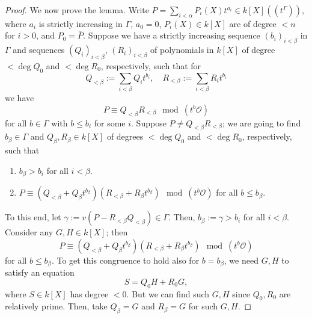 \begin{proof}
We now prove the lemma.  Write $P=\sum_{i<\alpha}P_i(X)t^{a_i}\in k[X]((t^\Gamma))$, where $a_i$ is strictly increasing in $\Gamma$, $a_0=0$, $P_i(X)\in k[X]$ are of degree $<n$ for $i>0$, and $P_0=\overline{P}$.  Suppose we have a strictly increasing sequence $(b_i)_{i<\beta}$ in $\Gamma$ and sequences $(Q_i)_{i<\beta}$, $(R_i)_{i<\beta}$ of polynomials in $k[X]$ of degree $<\deg Q_0$ and $<\deg R_0$, respectively, such that for
$$Q_{<\beta}:= \sum_{i<\beta}Q_it^{b_i}, \quad R_{<\beta}:= \sum_{i<\beta}R_it^{b_i}$$
we have 
$$P\equiv Q_{<\beta}R_{<\beta} \mod{(t^b\mathcal{O})}$$
for all $b\in \Gamma$ with $b\leq b_i$ for some $i$.  Suppose $P\neq Q_{<\beta}R_{<\beta}$; we are going to find $b_\beta\in \Gamma$ and $Q_\beta, R_\beta\in k[X]$ of degrees $< \deg Q_0$ and $< \deg R_0$, respectively, such that
\begin{enumerate}%
\item $b_\beta >b_i$ for all $i<\beta$.
\item $P\equiv (Q_{<\beta}+Q_\beta t^{b_\beta})(R_{<\beta} + R_\beta t^{b_\beta}) \mod{(t^b\mathcal{O})}$ for all $b\leq b_\beta$.  
\end{enumerate}
To this end, let $\gamma:= v(P-R_{<\beta}Q_{<\beta})\in \Gamma$.  Then, $b_\beta:= \gamma>b_i$ for all $i<\beta$.  Consider any $G, H\in k[X]$; then
$$P\equiv (Q_{<\beta}+Q_\beta t^{b_\beta})(R_{<\beta} + R_\beta t^{b_\beta}) \mod{(t^b\mathcal{O})}$$
for all $b\leq b_\beta$.  To get this congruence to hold also for $b=b_\beta$, we need $G, H$ to satisfy an equation
$$S=Q_0H+R_0G,$$
where $S\in k[X]$ has degree $<0$.  But we can find such $G, H$ since $Q_0, R_0$ are relatively prime.  Then, take $Q_\beta=G$ and $R_\beta= G$ for such $G, H$.  

\end{proof}